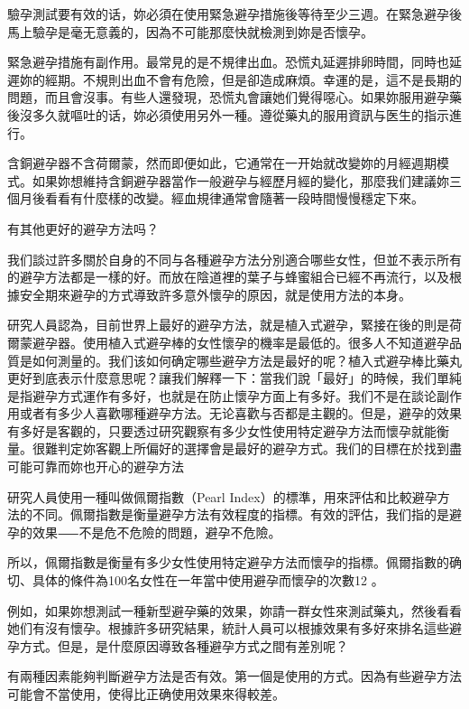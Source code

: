 \documentclass[12pt,UTF8]{ctexbook}
\begin{document}
驗孕測試要有效的话，妳必須在使用緊急避孕措施後等待至少三週。在緊急避孕後馬上驗孕是毫无意義的，因為不可能那麼快就檢測到妳是否懷孕。

緊急避孕措施有副作用。最常見的是不規律出血。恐慌丸延遲排卵時間，同時也延遲妳的經期。不規則出血不會有危險，但是卻造成麻煩。幸運的是，這不是長期的問題，而且會沒事。有些人還發現，恐慌丸會讓她们覺得噁心。如果妳服用避孕藥後沒多久就嘔吐的话，妳必須使用另外一種。遵從藥丸的服用資訊与医生的指示進行。

含銅避孕器不含荷爾蒙，然而即便如此，它通常在一开始就改變妳的月經週期模式。如果妳想維持含銅避孕器當作一般避孕与經歷月經的變化，那麼我们建議妳三個月後看看有什麼樣的改變。經血規律通常會隨著一段時間慢慢穩定下來。





有其他更好的避孕方法吗？




我们談过許多關於自身的不同与各種避孕方法分別適合哪些女性，但並不表示所有的避孕方法都是一樣的好。而放在陰道裡的葉子与蜂蜜組合已經不再流行，以及根據安全期來避孕的方式導致許多意外懷孕的原因，就是使用方法的本身。

研究人員認為，目前世界上最好的避孕方法，就是植入式避孕，緊接在後的則是荷爾蒙避孕器。使用植入式避孕棒的女性懷孕的機率是最低的。很多人不知道避孕品質是如何測量的。我们该如何确定哪些避孕方法是最好的呢？植入式避孕棒比藥丸更好到底表示什麼意思呢？讓我们解釋一下：當我们說「最好」的時候，我们單純是指避孕方式運作有多好，也就是在防止懷孕方面上有多好。我们不是在談论副作用或者有多少人喜歡哪種避孕方法。无论喜歡与否都是主觀的。但是，避孕的效果有多好是客觀的，只要透过研究觀察有多少女性使用特定避孕方法而懷孕就能衡量。很難判定妳客觀上所偏好的選擇會是最好的避孕方式。我们的目標在於找到盡可能可靠而妳也开心的避孕方法

研究人員使用一種叫做佩爾指數（Pearl Index）的標準，用來評估和比較避孕方法的不同。佩爾指數是衡量避孕方法有效程度的指標。有效的評估，我们指的是避孕的效果⸺不是危不危險的問題，避孕不危險。

所以，佩爾指數是衡量有多少女性使用特定避孕方法而懷孕的指標。佩爾指數的确切、具体的條件為100名女性在一年當中使用避孕而懷孕的次數12 。

例如，如果妳想測試一種新型避孕藥的效果，妳請一群女性來測試藥丸，然後看看她们有沒有懷孕。根據許多研究結果，統計人員可以根據效果有多好來排名這些避孕方式。但是，是什麼原因導致各種避孕方式之間有差別呢？

有兩種因素能夠判斷避孕方法是否有效。第一個是使用的方式。因為有些避孕方法可能會不當使用，使得比正确使用效果來得較差。
\end{document}
